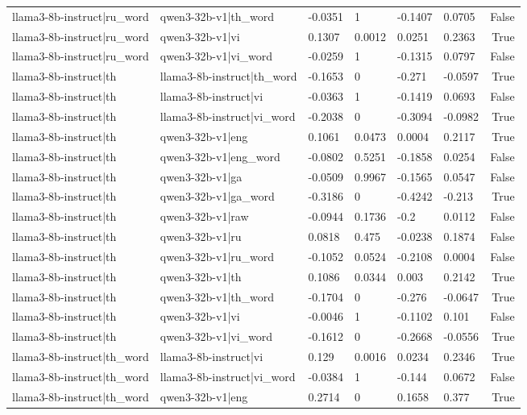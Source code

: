 \begin{table}
\begin{tabular}{llllllr}
llama3-8b-instruct|ru_word & qwen3-32b-v1|th_word & -0.0351 & 1 & -0.1407 & 0.0705 & False \\
llama3-8b-instruct|ru_word & qwen3-32b-v1|vi & 0.1307 & 0.0012 & 0.0251 & 0.2363 & True \\
llama3-8b-instruct|ru_word & qwen3-32b-v1|vi_word & -0.0259 & 1 & -0.1315 & 0.0797 & False \\
llama3-8b-instruct|th & llama3-8b-instruct|th_word & -0.1653 & 0 & -0.271 & -0.0597 & True \\
llama3-8b-instruct|th & llama3-8b-instruct|vi & -0.0363 & 1 & -0.1419 & 0.0693 & False \\
llama3-8b-instruct|th & llama3-8b-instruct|vi_word & -0.2038 & 0 & -0.3094 & -0.0982 & True \\
llama3-8b-instruct|th & qwen3-32b-v1|eng & 0.1061 & 0.0473 & 0.0004 & 0.2117 & True \\
llama3-8b-instruct|th & qwen3-32b-v1|eng_word & -0.0802 & 0.5251 & -0.1858 & 0.0254 & False \\
llama3-8b-instruct|th & qwen3-32b-v1|ga & -0.0509 & 0.9967 & -0.1565 & 0.0547 & False \\
llama3-8b-instruct|th & qwen3-32b-v1|ga_word & -0.3186 & 0 & -0.4242 & -0.213 & True \\
llama3-8b-instruct|th & qwen3-32b-v1|raw & -0.0944 & 0.1736 & -0.2 & 0.0112 & False \\
llama3-8b-instruct|th & qwen3-32b-v1|ru & 0.0818 & 0.475 & -0.0238 & 0.1874 & False \\
llama3-8b-instruct|th & qwen3-32b-v1|ru_word & -0.1052 & 0.0524 & -0.2108 & 0.0004 & False \\
llama3-8b-instruct|th & qwen3-32b-v1|th & 0.1086 & 0.0344 & 0.003 & 0.2142 & True \\
llama3-8b-instruct|th & qwen3-32b-v1|th_word & -0.1704 & 0 & -0.276 & -0.0647 & True \\
llama3-8b-instruct|th & qwen3-32b-v1|vi & -0.0046 & 1 & -0.1102 & 0.101 & False \\
llama3-8b-instruct|th & qwen3-32b-v1|vi_word & -0.1612 & 0 & -0.2668 & -0.0556 & True \\
llama3-8b-instruct|th_word & llama3-8b-instruct|vi & 0.129 & 0.0016 & 0.0234 & 0.2346 & True \\
llama3-8b-instruct|th_word & llama3-8b-instruct|vi_word & -0.0384 & 1 & -0.144 & 0.0672 & False \\
llama3-8b-instruct|th_word & qwen3-32b-v1|eng & 0.2714 & 0 & 0.1658 & 0.377 & True \\

\end{tabular}
\end{table}
